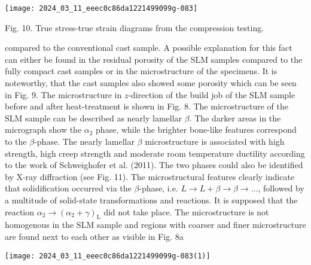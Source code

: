 \documentclass[10pt]{article}
\begin{document}
\begin{center}
\texttt{[image: 2024\_03\_11\_eeec0c86da1221499099g-083]}
\end{center}

Fig. 10. True stress-true strain diagrams from the compression testing.

compared to the conventional cast sample. A possible explanation for this fact can either be found in the residual porosity of the SLM samples compared to the fully compact cast samples or in the microstructure of the specimens. It is noteworthy, that the cast samples also showed some porosity which can be seen in Fig. 9. The microstructure in $z$-direction of the build job of the SLM sample before and after heat-treatment is shown in Fig. 8. The microstructure of the SLM sample can be described as nearly lamellar $\beta$. The darker areas in the micrograph show the $\alpha_{2}$ phase, while the brighter bone-like features correspond to the $\beta$-phase. The nearly lamellar $\beta$ microstructure is associated with high strength, high creep strength and moderate room temperature ductility according to the work of Schweighofer et al. (2011). The two phases could also be identified by X-ray diffraction (see Fig. 11). The microstructural features clearly indicate that solidification occurred via the $\beta$-phase, i.e. $L \rightarrow L+\beta \rightarrow \beta \rightarrow \ldots$, followed by a multitude of solid-state transformations and reactions. It is supposed that the reaction $\alpha_{2} \rightarrow\left(\alpha_{2}+\gamma\right)_{\mathrm{L}}$ did not take place. The microstructure is not homogenous in the SLM sample and regions with coarser and finer microstructure are found next to each other as visible in Fig. 8a

\begin{center}
\texttt{[image: 2024\_03\_11\_eeec0c86da1221499099g-083(1)]}
\end{center}
\end{document}
